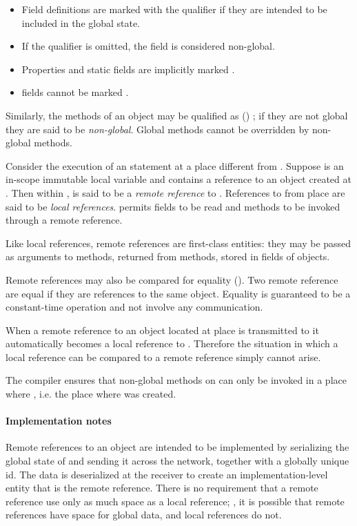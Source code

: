  \begin{itemize}
\item Field definitions are marked with the qualifier  if
  they are intended to be included in the global state.
\item If the  qualifier is omitted, the field is
  considered non-global.
\item Properties and static fields are implicitly marked .
\item {} fields cannot be marked .
\end{itemize}
 
Similarly, the methods of an object may be qualified as
() ; if they are not global they are
said to be \emph{non-global}. 
Global methods cannot be overridden by non-global methods.

Consider the execution of an  statement at a place
 different from . Suppose  is an in-scope
immutable local variable and contains a reference to an object 
created at . Then within ,  is said to be a
\emph{remote reference} to . References to  from place
 are said to be \emph{local references}. \Xten{} permits
 fields to be read and  methods to be invoked
through a remote reference.

Like local references, remote references are first-class entities:
they may be passed as arguments to methods, returned from methods,
stored in fields of objects.

Remote references may also be compared for equality (\Xcd{==}). Two
remote reference are equal if they are references to the same
object. Equality is guaranteed to be a constant-time operation and not
involve any communication.

When a remote reference to an object  located at place  is
transmitted to  it automatically becomes a local reference to
. Therefore the situation in which a local reference can be compared
to a remote reference simply cannot arise.

The \Xten{} compiler ensures that non-global methods on  can
only be invoked in a place where , i.e. the place
where  was created.

\paragraph{Implementation notes}
Remote references to an object  are intended to be implemented by
serializing the global state of  and sending it across the network,
together with a globally unique id. The data is deserialized at the receiver
to create an implementation-level entity that is the remote reference.
There is no requirement that a remote reference use only as much space as a
local reference; \eg, it is possible that remote references have space for
global data, and local references do not.


